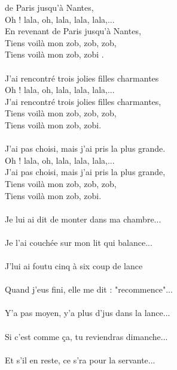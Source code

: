 
 de Paris jusqu'à Nantes,
\\Oh ! lala, oh, lala, lala, lala,...
\\En revenant de Paris jusqu'à Nantes,
\\Tiens voilà mon zob, zob, zob,
\\Tiens voilà mon zob, zobi .
\\\\J'ai rencontré trois jolies filles charmantes
\\Oh ! lala, oh, lala, lala, lala,...
\\J'ai rencontré trois jolies filles charmantes,
\\Tiens voilà mon zob, zob, zob,
\\Tiens voilà mon zob, zobi.
\\\\J'ai pas choisi, mais j'ai pris la plus grande.
\\Oh ! lala, oh, lala, lala, lala,...
\\J'ai pas choisi, mais j'ai pris la plus grande,
\\Tiens voilà mon zob, zob, zob,
\\Tiens voilà mon zob, zobi.
\\\\Je lui ai dit de monter dans ma chambre...
\\\\Je l'ai couchée sur mon lit qui balance...
\\\\J'lui ai foutu cinq à six coup de lance
\\\\Quand j'eus fini, elle me dit : "recommence"...
\\\\Y'a pas moyen, y'a plus d'jus dans la lance...
\\\\Si c'est comme ça, tu reviendras dimanche...
\\\\Et s'il en reste, ce s'ra pour la servante...
\\\\\\

\breakpage